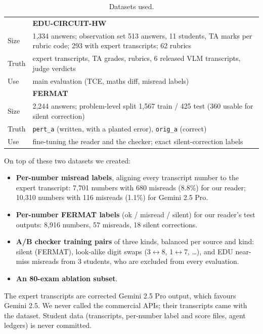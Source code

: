\documentclass[11pt]{article}
\newcommand{\tool}[1]{\texttt{\small #1}}
\begin{document}
\begin{table}[h]
\centering\small
\begin{tabularx}{\columnwidth}{@{}lY@{}}
\toprule
& \textbf{EDU-CIRCUIT-HW} \\
Size & 1,334 answers; observation set 513 answers, 11 students, TA marks per rubric code; 293 with expert transcripts; 62 rubrics \\
Truth & expert transcripts, TA grades, rubrics, 6 released VLM transcripts, judge verdicts \\
Use & main evaluation (TCE, maths diff, misread labels) \\
\midrule
& \textbf{FERMAT} \\
Size & 2,244 answers; problem-level split 1,567 train / 425 test (360 usable for silent correction) \\
Truth & \tool{pert\_a} (written, with a planted error), \tool{orig\_a} (correct) \\
Use & fine-tuning the reader and the checker; exact silent-correction labels \\
\bottomrule
\end{tabularx}
\caption{Datasets used.}
\label{tab:data}
\end{table}

On top of these two datasets we created:
\begin{itemize}
  \item \textbf{Per-number misread labels}, aligning every transcript number to the expert transcript: 7,701 numbers with 680 misreads (8.8\%) for our reader; 10,310 numbers with 116 misreads (1.1\%) for Gemini 2.5 Pro.
  \item \textbf{Per-number FERMAT labels} (ok / misread / silent) for our reader's test outputs: 8,916 numbers, 57 misreads, 18 silent corrections.
  \item \textbf{A/B checker training pairs} of three kinds, balanced per source and kind: silent (FERMAT), look-alike digit swaps (3$\leftrightarrow$8, 1$\leftrightarrow$7, \dots), and EDU near-miss misreads from 3 students, who are excluded from every evaluation.
  \item \textbf{An 80-exam ablation subset}.
\end{itemize}
The expert transcripts are corrected Gemini 2.5 Pro output, which favours Gemini 2.5. We never called the commercial APIs; their transcripts came with the dataset. Student data (transcripts, per-number label and score files, agent ledgers) is never committed.

\end{document}
